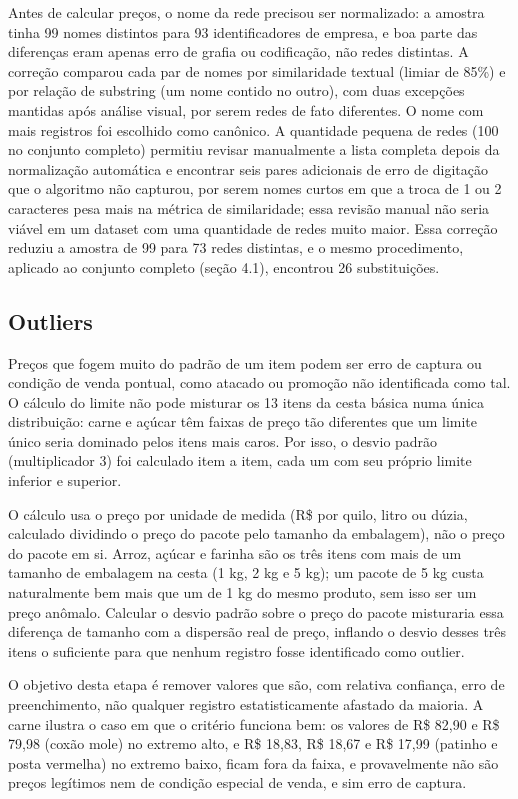 \documentclass[11pt,a4paper]{article}
\begin{document}
Antes de calcular preços, o nome da rede precisou ser normalizado: a amostra tinha 99 nomes distintos para 93 identificadores de empresa, e boa parte das diferenças eram apenas erro de grafia ou codificação, não redes distintas. A correção comparou cada par de nomes por similaridade textual (limiar de 85\%) e por relação de substring (um nome contido no outro), com duas excepções mantidas após análise visual, por serem redes de fato diferentes. O nome com mais registros foi escolhido como canônico. A quantidade pequena de redes (100 no conjunto completo) permitiu revisar manualmente a lista completa depois da normalização automática e encontrar seis pares adicionais de erro de digitação que o algoritmo não capturou, por serem nomes curtos em que a troca de 1 ou 2 caracteres pesa mais na métrica de similaridade; essa revisão manual não seria viável em um dataset com uma quantidade de redes muito maior. Essa correção reduziu a amostra de 99 para 73 redes distintas, e o mesmo procedimento, aplicado ao conjunto completo (seção 4.1), encontrou 26 substituições.

\subsection{Outliers}

Preços que fogem muito do padrão de um item podem ser erro de captura ou condição de venda pontual, como atacado ou promoção não identificada como tal. O cálculo do limite não pode misturar os 13 itens da cesta básica numa única distribuição: carne e açúcar têm faixas de preço tão diferentes que um limite único seria dominado pelos itens mais caros. Por isso, o desvio padrão (multiplicador 3) foi calculado item a item, cada um com seu próprio limite inferior e superior.

O cálculo usa o preço por unidade de medida (R\$ por quilo, litro ou dúzia, calculado dividindo o preço do pacote pelo tamanho da embalagem), não o preço do pacote em si. Arroz, açúcar e farinha são os três itens com mais de um tamanho de embalagem na cesta (1 kg, 2 kg e 5 kg); um pacote de 5 kg custa naturalmente bem mais que um de 1 kg do mesmo produto, sem isso ser um preço anômalo. Calcular o desvio padrão sobre o preço do pacote misturaria essa diferença de tamanho com a dispersão real de preço, inflando o desvio desses três itens o suficiente para que nenhum registro fosse identificado como outlier.

O objetivo desta etapa é remover valores que são, com relativa confiança, erro de preenchimento, não qualquer registro estatisticamente afastado da maioria. A carne ilustra o caso em que o critério funciona bem: os valores de R\$ 82,90 e R\$ 79,98 (coxão mole) no extremo alto, e R\$ 18,83, R\$ 18,67 e R\$ 17,99 (patinho e posta vermelha) no extremo baixo, ficam fora da faixa, e provavelmente não são preços legítimos nem de condição especial de venda, e sim erro de captura.
\end{document}
